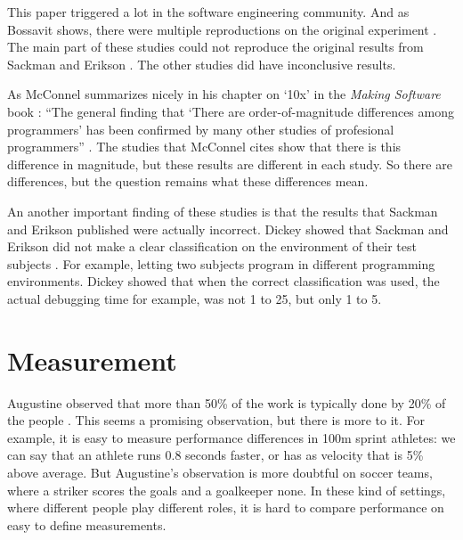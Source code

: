 This paper triggered a lot in the software engineering community.
And as Bossavit shows, there were multiple reproductions on the original experiment \autocite[38,41]{bossavit2013leprechauns}.
The main part of these studies could not reproduce the original results from Sackman and Erikson \autocite[42-44]{bossavit2013leprechauns}.
The other studies did have inconclusive results.

As McConnel summarizes nicely in his chapter on `10x' in the \textit{Making Software} book \autocite{MAKING_SOFTWARE}:
``The general finding that `There are order-of-magnitude differences among programmers' has been confirmed by many other studies of profesional programmers'' \autocite[568]{MAKING_SOFTWARE}.
The studies that McConnel cites show that there is this difference in magnitude, but these results are different in each study.
So there are differences, but the question remains what these differences mean.

An another important finding of these studies is that the results that Sackman and Erikson published were actually incorrect.
Dickey showed that Sackman and Erikson did not make a clear classification on the environment of their test subjects \autocite[844]{dickey1981programmer}.
For example, letting two subjects program in different programming environments.
Dickey showed that when the correct classification was used, the actual debugging time for example, was not 1 to 25, but only 1 to 5.

\section*{Measurement}

Augustine observed that more than 50\% of the work is typically done by 20\% of the people \autocite{augustine}\autocite[268]{demarco1985programmer}.
This seems a promising observation, but there is more to it.
For example, it is easy to measure performance differences in 100m sprint athletes:
we can say that an athlete runs 0.8 seconds faster, or has as velocity that is 5\% above average.
But Augustine's observation is more doubtful on soccer teams, where a striker scores the goals and a goalkeeper none.
In these kind of settings, where different people play different roles, it is hard to compare performance on easy to define measurements.

